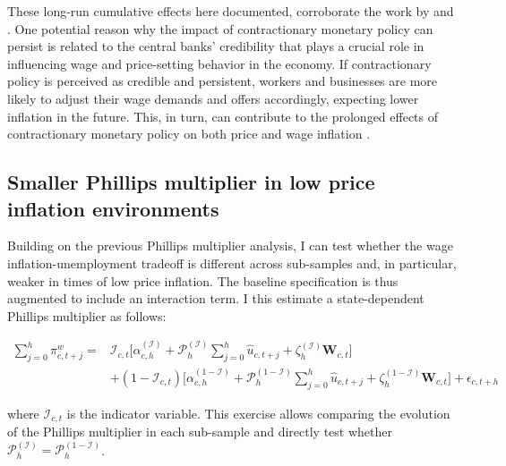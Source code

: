 \documentclass[12pt]{article}
\renewcommand{\vec}[1]{\mathbf{#1}}
\begin{document}
These long-run cumulative effects here documented, corroborate the work by \cite{Jorda2019} and \cite{Barnichon2019}. One potential reason why the impact of contractionary monetary policy can persist is related to the central banks' credibility that plays a crucial role in influencing wage and price-setting behavior in the economy. If contractionary policy is perceived as credible and persistent, workers and businesses are more likely to adjust their wage demands and offers accordingly, expecting lower inflation in the future. This, in turn, can contribute to the prolonged effects of contractionary monetary policy on both price and wage inflation \citep{Melosi2017}.



\subsection{Smaller Phillips multiplier in low price inflation environments}

Building on the previous Phillips multiplier analysis, I can test whether the wage inflation-unemployment tradeoff is different across sub-samples and, in particular, weaker in times of low price inflation. The baseline specification is thus augmented to include an interaction term. I this estimate a state-dependent Phillips multiplier as follows:

\begin{equation} \label{EQ:MULT_State}
\begin{split}
	\sum_{j=0}^{h} \pi_{c,t+j}^{w} = & \mathcal{I}_{c,t} \Bigg[\alpha_{c,h}^{(\mathcal{I})} + \mathcal{P}^{(\mathcal{I})}_h \sum_{j=0}^{h} \hat{u}_{c,t+j} + \zeta^{(\mathcal{I})}_h \vec{W}_{c,t}\Bigg] \\  
	& + (1 - \mathcal{I}_{c,t}) \Bigg[\alpha_{c,h}^{(1-\mathcal{I})} + \mathcal{P}^{(1-\mathcal{I})}_h \sum_{j=0}^{h} \hat{u}_{c,t+j} + \zeta^{(1-\mathcal{I})}_h \vec{W}_{c,t}\Bigg] +  \epsilon_{c,t+h}
\end{split}
\end{equation}

where $\mathcal{I}_{c,t}$ is the indicator variable. This exercise allows comparing the evolution of the Phillips multiplier in each sub-sample and directly test whether $\mathcal{P}_h^{(\mathcal{I})} = \mathcal{P}_h^{(1 - \mathcal{I})}$.
\end{document}
